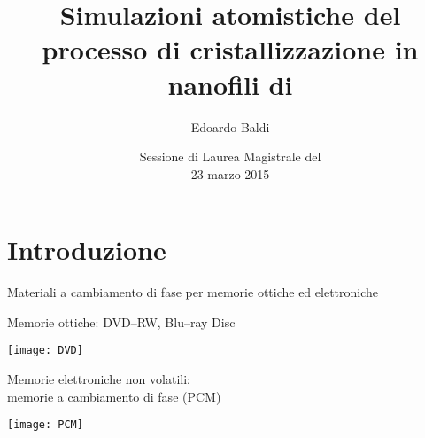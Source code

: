 \documentclass{beamer}
\title[Cristallizzazione in nanofili di \gete] %
{Simulazioni atomistiche del processo di cristallizzazione in nanofili di \gete}
\author[Edoardo Baldi] %
{Edoardo Baldi\\\medskip {\small\emph{Relatore:} Prof.~Marco~Bernasconi}}
\institute[Università di Milano--Bicocca]{Università di Milano--Bicocca --- Dipartimento di Fisica}
\date[23 marzo 2015] %
{{\small Sessione di Laurea Magistrale del} \\[3pt] 23 marzo 2015}
\begin{document}
\begin{frame}
  \titlepage
\end{frame}



\section{Introduzione}

\begin{frame}{Materiali a cambiamento di fase per memorie ottiche ed elettroniche}
\begin{minipage}{1.0\textwidth}
  \begin{minipage}[b]{0.53\linewidth}
  Memorie ottiche: {\ev DVD--RW, Blu--ray Disc}
  \end{minipage}
\hfill
  \begin{minipage}[b]{0.43\linewidth}\centering
  \texttt{[image: DVD]}
  \end{minipage}
\end{minipage}
\begin{minipage}{1.0\textwidth}
  \begin{minipage}[b]{0.53\linewidth}
  Memorie elettroniche non volatili:\hfill\\ {\ev memorie a cambiamento di fase} (PCM)
  \end{minipage}
\hfill
  \begin{minipage}[b]{0.43\linewidth}\centering
  \texttt{[image: PCM]}\\
  \end{minipage}
\end{minipage}
\vspace{1cm}\\
\end{frame}
\end{document}
